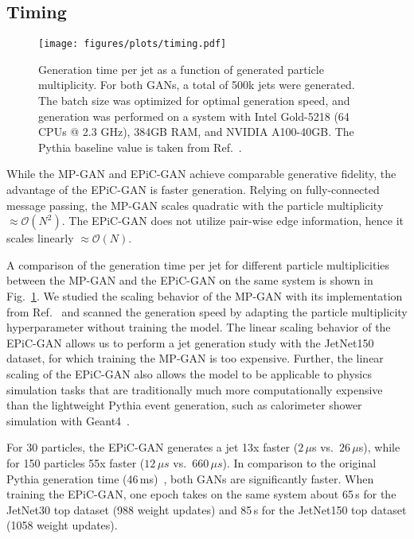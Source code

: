 \documentclass[a4paper,submission, Phys]{SciPost}
\DeclareRobustCommand{\Fig}[1]{Fig.~\ref{fig:#1}}
\DeclareRobustCommand{\Reff}[1]{Ref.~\cite{#1}}
\begin{document}
\subsection{Timing}
\label{sec:timing}


\begin{figure}[tbp]
\centering
\texttt{[image: figures/plots/timing.pdf]}
\caption{
%
Generation time per jet as a function of generated particle multiplicity.
%
For both GANs, a total of 500k jets were generated.
%
The batch size was optimized for optimal generation speed, and generation was performed on a system with Intel Gold-5218 (64 CPUs @ 2.3 GHz), 384GB RAM, and NVIDIA A100-40GB.
%
The Pythia baseline value is taken from \Reff{MPGAN}.
}
\label{fig:timing} 
\end{figure}


While the MP-GAN and EPiC-GAN achieve comparable generative fidelity, the advantage of the EPiC-GAN is faster generation. 
%
Relying on fully-connected message passing, the MP-GAN scales quadratic with the particle multiplicity $\approx \mathcal{O}(N^2)$. 
%
The EPiC-GAN does not utilize pair-wise edge information, hence it scales linearly $\approx \mathcal{O}(N)$. 


A comparison of the generation time per jet for different particle multiplicities between the MP-GAN and the EPiC-GAN on the same system is shown in \Fig{timing}. 
%
We studied the scaling behavior of the MP-GAN with its implementation from \Reff{MPGAN} and scanned the generation speed by adapting the particle multiplicity hyperparameter without training the model.
%
The linear scaling behavior of the EPiC-GAN allows us to perform a jet generation study with the JetNet150 dataset, for which training the MP-GAN is too expensive. 
% 
Further, the linear scaling of the EPiC-GAN also allows the model to be applicable to physics simulation tasks that are traditionally much more computationally expensive than the lightweight Pythia event generation, such as calorimeter shower simulation with Geant4~\cite{AGOSTINELLI2003250_Geant4}.

For 30 particles, the EPiC-GAN generates a jet 13x faster ($2\,\mu$s vs.\ $26\,\mu $s), while for 150 particles 55x faster ($12\,\mu s$ vs.\ $660\,\mu s$). 
%
In comparison to the original Pythia generation time (46\,ms)~\cite{MPGAN}, both GANs are significantly faster. 
%
When training the EPiC-GAN, one epoch takes on the same system about 65\,s for the JetNet30 top dataset (988 weight updates) and 85\,s for the JetNet150 top dataset (1058 weight updates).
\end{document}
